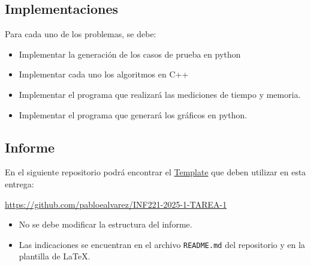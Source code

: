 
\subsection{Implementaciones}

Para cada uno de los problemas, se debe:
\begin{itemize}
    \item Implementar la generación de los casos de prueba en python 
    \item Implementar cada uno los algoritmos en C++
    \item Implementar el programa que realizará las mediciones de tiempo y memoria.
    \item Implementar el programa que generará los gráficos en python.
\end{itemize}

\subsection{Informe}


En el siguiente repositorio podrá encontrar el \href{https://github.com/pabloealvarez/INF221-2025-1-TAREA-1}{Template} que deben utilizar en esta entrega:

\begin{mdframed}

    \begin{center}
    {\Large
    \url{https://github.com/pabloealvarez/INF221-2025-1-TAREA-1}
    }    
\end{center}
\end{mdframed}

\begin{itemize}
    \item No se debe modificar la estructura del informe.
    \item Las indicaciones se encuentran en el archivo \texttt{README.md} del repositorio y en la plantilla de \LaTeX. 
\end{itemize}

